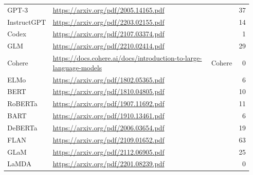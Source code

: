 \begin{table}[htp]
{\begin{tabular}{lllr}
GPT-3           & \url{https://arxiv.org/pdf/2005.14165.pdf}                                                                         & \citet{brown2020gpt3} &  37\\
InstructGPT     & \url{https://arxiv.org/pdf/2203.02155.pdf}                                                                         & \citet{ouyang2022instructions} &  14\\
Codex           & \url{https://arxiv.org/pdf/2107.03374.pdf}                                                                         & \citet{chen2021codex} &  1\\
GLM             & \url{https://arxiv.org/pdf/2210.02414.pdf}                                                                         & \citet{zeng2022glm} &  29\\
Cohere          & \url{https://docs.cohere.ai/docs/introduction-to-large-language-models}                                            & Cohere &  0\\
ELMo            & \url{https://arxiv.org/pdf/1802.05365.pdf}                                                                         & \citet{peters2018elmo} &  6\\
BERT            & \url{https://arxiv.org/pdf/1810.04805.pdf}                                                                         & \citet{devlin2019bert} &  10\\
RoBERTa         & \url{https://arxiv.org/pdf/1907.11692.pdf}                                                                         & \citet{liu2019roberta} &  11\\
BART            & \url{https://arxiv.org/pdf/1910.13461.pdf}                                                                         & \citet{lewis2020bart} &  6\\
DeBERTa         & \url{https://arxiv.org/pdf/2006.03654.pdf}                                                                         & \citet{he2021deberta} &  19\\
FLAN            & \url{https://arxiv.org/pdf/2109.01652.pdf}                                                                         & \citet{wei2022flan} &  63\\
GLaM            & \url{https://arxiv.org/pdf/2112.06905.pdf}                                                                         & \citet{du2021glam} &  25\\
LaMDA           & \url{https://arxiv.org/pdf/2201.08239.pdf}                                                                         & \citet{thoppilan2022lamda} &  0\\

\end{tabular}}
\end{table}
